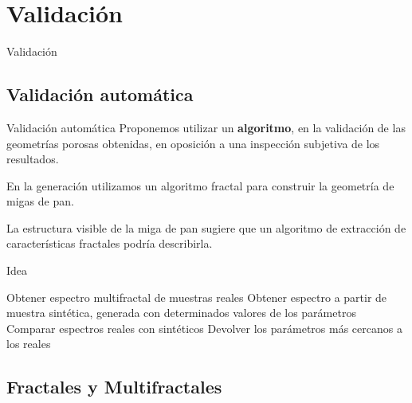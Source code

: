 \documentclass[spanish]{beamer}
\begin{document}
\section{Validación}



\begin{frame}
\begin{block}{}
\begin{center}
\vspace{1cm}
\huge{Validación}
\vspace{1cm}
\end{center}
\end{block}
\end{frame}


\subsection{Validación automática}

\begin{frame}{Validación automática}
Proponemos utilizar un \textbf{algoritmo}, en la validación de las geometrías porosas obtenidas, en oposición a una inspección subjetiva de los resultados.

En la generación utilizamos un algoritmo fractal para construir la geometría de migas de pan.

La estructura visible de la miga de pan sugiere que un algoritmo de extracción de características fractales podría describirla.


\end{frame}

\begin{frame}{Idea}
\begin{algorithm}[H]
\begin{algorithmic}[1]
\STATE Obtener espectro multifractal de muestras reales
\STATE Obtener espectro a partir de muestra sintética, generada con determinados valores de los parámetros
\STATE Comparar espectros reales con sintéticos
\ENDFOR
\STATE Devolver los parámetros más cercanos a los reales
\end{algorithmic}
\end{algorithm}
\end{frame}

\subsection{Fractales y Multifractales}
\end{document}
